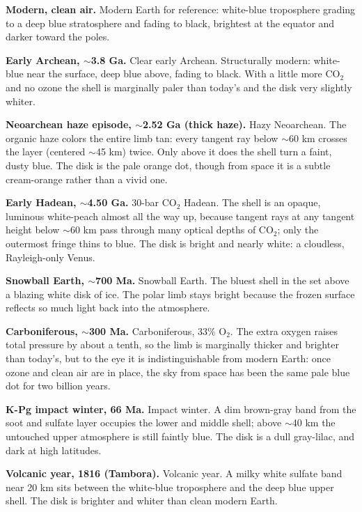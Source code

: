 \documentclass[9pt,twocolumn]{extarticle}
\begin{document}
{\footnotesize
\textbf{Modern, clean air.} Modern Earth for reference: white-blue troposphere grading to a deep blue stratosphere and fading to black, brightest at the equator and darker toward the poles.

\textbf{Early Archean, $\sim$3.8 Ga.} Clear early Archean. Structurally modern: white-blue near the surface, deep blue above, fading to black. With a little more CO$_2$ and no ozone the shell is marginally paler than today's and the disk very slightly whiter.

\textbf{Neoarchean haze episode, $\sim$2.52 Ga (thick haze).} Hazy Neoarchean. The organic haze colors the entire limb tan: every tangent ray below $\sim$60 km crosses the layer (centered $\sim$45 km) twice. Only above it does the shell turn a faint, dusty blue. The disk is the pale orange dot, though from space it is a subtle cream-orange rather than a vivid one.

\textbf{Early Hadean, $\sim$4.50 Ga.} 30-bar CO$_2$ Hadean. The shell is an opaque, luminous white-peach almost all the way up, because tangent rays at any tangent height below $\sim$60 km pass through many optical depths of CO$_2$; only the outermost fringe thins to blue. The disk is bright and nearly white: a cloudless, Rayleigh-only Venus.

\textbf{Snowball Earth, $\sim$700 Ma.} Snowball Earth. The bluest shell in the set above a blazing white disk of ice. The polar limb stays bright because the frozen surface reflects so much light back into the atmosphere.

\textbf{Carboniferous, $\sim$300 Ma.} Carboniferous, 33\% O$_2$. The extra oxygen raises total pressure by about a tenth, so the limb is marginally thicker and brighter than today's, but to the eye it is indistinguishable from modern Earth: once ozone and clean air are in place, the sky from space has been the same pale blue dot for two billion years.

\textbf{K-Pg impact winter, 66 Ma.} Impact winter. A dim brown-gray band from the soot and sulfate layer occupies the lower and middle shell; above $\sim$40 km the untouched upper atmosphere is still faintly blue. The disk is a dull gray-lilac, and dark at high latitudes.

\textbf{Volcanic year, 1816 (Tambora).} Volcanic year. A milky white sulfate band near 20 km sits between the white-blue troposphere and the deep blue upper shell. The disk is brighter and whiter than clean modern Earth.

}
\end{document}

